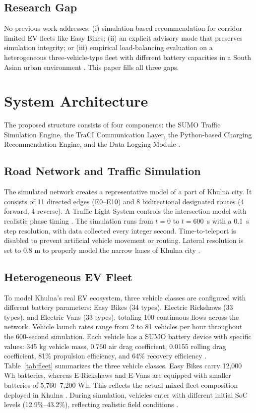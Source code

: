 \documentclass[conference]{IEEEtran}
\begin{document}
\subsection{Research Gap}

No previous work addresses: (i) simulation-based recommendation for corridor-limited EV fleets like Easy Bikes; (ii) an explicit advisory mode that preserves simulation integrity; or (iii) empirical load-balancing evaluation on a heterogeneous three-vehicle-type fleet with different battery capacities in a South Asian urban environment \cite{b9, b13}. This paper fills all three gaps.

\section{System Architecture}

The proposed structure consists of four components: the SUMO Traffic Simulation Engine, the TraCI Communication Layer, the Python-based Charging Recommendation Engine, and the Data Logging Module \cite{b10, b11}.

\subsection{Road Network and Traffic Simulation}

The simulated network creates a representative model of a part of Khulna city. It consists of 11 directed edges (E0--E10) and 8 bidirectional designated routes (4 forward, 4 reverse). A Traffic Light System controls the intersection model with realistic phase timing \cite{b19}. The simulation runs from $t=0$ to $t=600$~s with a 0.1~s step resolution, with data collected every integer second. Time-to-teleport is disabled to prevent artificial vehicle movement or routing. Lateral resolution is set to 0.8 m to properly model the narrow lanes of Khulna city \cite{b2, b3}.

\subsection{Heterogeneous EV Fleet}

To model Khulna's real EV ecosystem, three vehicle classes are configured with different battery parameters: Easy Bikes (34 types), Electric Rickshaws (33 types), and Electric Vans (33 types), totaling 100 continuous flows across the network. Vehicle launch rates range from 2 to 81 vehicles per hour throughout the 600-second simulation. Each vehicle has a SUMO battery device with specific values: 345 kg vehicle mass, 0.760 air drag coefficient, 0.0155 rolling drag coefficient, 81\% propulsion efficiency, and 64\% recovery efficiency \cite{b20}. Table~\ref{tab:fleet} summarizes the three vehicle classes. Easy Bikes carry 12,000 Wh batteries, whereas E-Rickshaws and E-Vans are equipped with smaller batteries of 5,760--7,200 Wh. This reflects the actual mixed-fleet composition deployed in Khulna \cite{b2, b3}. During simulation, vehicles enter with different initial SoC levels (12.9\%--43.2\%), reflecting realistic field conditions \cite{b13}.
\end{document}
